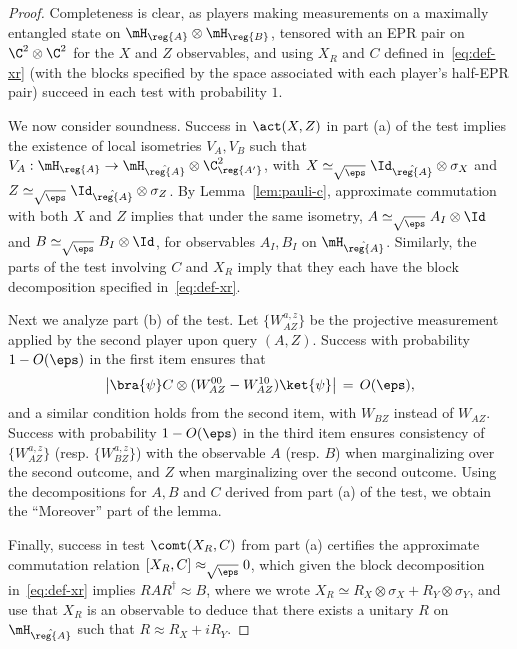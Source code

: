 \begin{proof}
Completeness is clear, as players making measurements on a maximally entangled state on $\mH_{\reg{A}}\otimes \mH_{\reg{B}}$, tensored with an EPR pair on $\C^2 \otimes \C^2$ for the $X$ and $Z$ observables, and using $X_R$ and $C$ defined in~\eqref{eq:def-xr} (with the blocks specified by the space associated with each player's half-EPR pair) succeed in each test with probability $1$. 

We now consider soundness. Success in $\act(X,Z)$ in part (a) of the test implies the existence of local isometries $V_A,V_B$ such that $V_A:\mH_\reg{A}\to \mH_{\hat{\reg{A}}}\otimes \C^2_{\reg{A'}}$, with $X\simeq_{\sqrt{\eps}} \Id_{\hat{\reg{A}}}\otimes \sigma_X$ and $Z\simeq_{\sqrt{\eps}} \Id_{\hat{\reg{A}}}\otimes\sigma_Z$. By Lemma~\ref{lem:pauli-c}, approximate commutation with both $X$ and $Z$ implies that under the same isometry, $A\simeq_{\sqrt{\eps}} A_I \otimes \Id$ and $B\simeq_{\sqrt{\eps}} B_I \otimes \Id$, for observables $A_I, B_I$ on $\mH_{\hat{\reg{A}}}$. Similarly, the parts of the test involving $C$ and $X_R$ imply that they each have the block decomposition specified in~\eqref{eq:def-xr}. 

Next we analyze part (b) of the test. Let $\{W_{AZ}^{a,z}\}$ be the projective measurement applied by the second player upon query $(A,Z)$. Success with probability $1-O(\eps)$ in the first item ensures that 
$$\big| \bra{\psi} C \otimes (W_{AZ}^{00} - W_{AZ}^{10})\ket{\psi} \big| \,=\,O(\eps),$$
and a similar condition holds from the second item, with $W_{BZ}$ instead of $W_{AZ}$. Success with probability $1-O(\eps)$ in the third item ensures consistency of $\{W_{AZ}^{a,z}\}$ (resp. $\{W_{BZ}^{a,z}\}$) with the observable $A$ (resp. $B$) when marginalizing over the second outcome, and $Z$ when marginalizing over the second outcome. Using the decompositions for $A,B$ and $C$ derived from part (a) of the test, we obtain the ``Moreover'' part of the lemma. 

Finally, success in test $\comt(X_R,C)$ from part (a) certifies the approximate commutation relation $[X_R,C]\approx_{\sqrt{\eps}} 0$, which given the block decomposition in~\eqref{eq:def-xr} implies $RAR^\dagger \approx B$, where we wrote $X_R \simeq R_X \otimes \sigma_X + R_Y \otimes \sigma_Y$, and use that $X_R$ is an observable to deduce that there exists a unitary $R$ on $\mH_{\hat{\reg{A}}}$ such that $R \approx R_X + i R_Y$. 
\end{proof}



